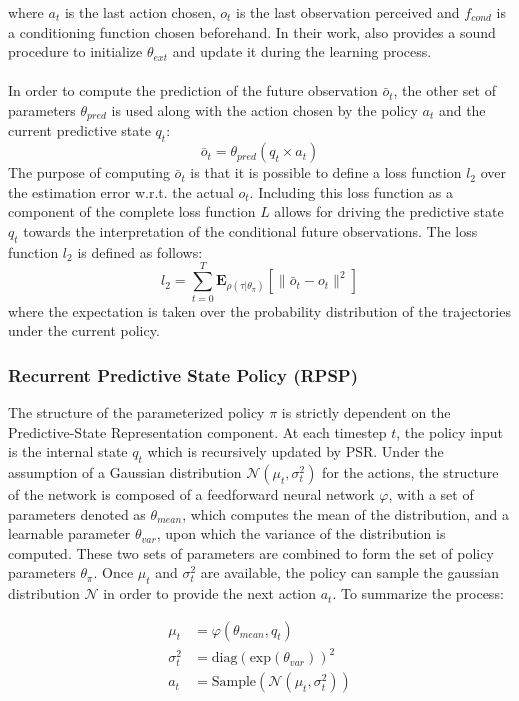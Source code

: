                 where $a_t$ is the last action chosen, $o_t$ is the last observation perceived and $f_{cond}$ is a conditioning function chosen beforehand. In their work,  also provides a sound procedure to initialize $\theta_{ext}$ and update it during the learning process.
                \\\\
                In order to compute the prediction of the future observation $\bar{o}_t$, the other set of parameters $\theta_{pred}$ is used along with the action chosen by the policy $a_t$ and the current predictive state $q_t$:
                \[ \bar{o}_t = \theta_{pred} (q_t \times a_t)\]
                The purpose of computing $\bar{o}_t$ is that it is possible to define a loss function $l_2$ over the estimation error w.r.t. the actual $o_t$. Including this loss function as a component of the complete loss function $L$ allows for driving the predictive state $q_t$ towards the interpretation of the conditional future observations. The loss function $l_2$ is defined as follows:
                \[ l_2 = \sum_{t=0}^{T} \mathbf{E}_{\rho(\tau|\theta_\pi)} \left[ \| \bar{o}_t - o_t \|^2 \right]\]
                where the expectation is taken over the probability distribution of the trajectories under the current policy.
            
            \subsubsection{Recurrent Predictive State Policy (RPSP)}
                The structure of the parameterized policy $\pi$ is strictly dependent on the Predictive-State Representation component. At each timestep $t$, the policy input is the internal state $q_t$ which is recursively updated by PSR. Under the assumption of a Gaussian distribution $\mathcal{N}(\mu_{t}, \sigma_{t}^{2})$ for the actions, the structure of the network is composed of a feedforward neural network $\varphi$, with a set of parameters denoted as $\theta_{mean}$, which computes the mean of the distribution, and a learnable parameter $\theta_{var}$, upon which the variance of the distribution is computed. These two sets of parameters are combined to form the set of policy parameters $\theta_\pi$. Once $\mu_{t}$ and $\sigma_{t}^{2}$ are available, the policy can sample the gaussian distribution $\mathcal{N}$ in order to provide the next action $a_t$. To summarize the process:
                
                \begin{align*}
                    \mu_{t} &= \varphi(\theta_{mean}, q_t)\\ \sigma_{t}^{2} &= \text{diag}(\text{exp}(\theta_{var}))^{2}\\
                    a_t &= \text{Sample}(\mathcal{N}(\mu_{t}, \sigma_{t}^{2}))
                \end{align*}
                
